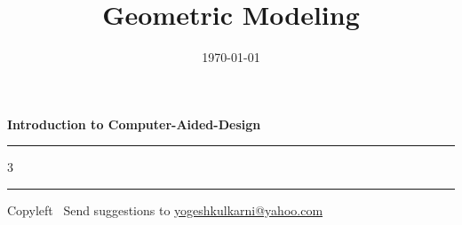 \documentclass[9pt,portrait]{article}
\title[Intro to CAD \hspace{4cm} \insertframenumber /\inserttotalframenumber]{Geometric Modeling}
\subtitle[]{}
\date[2014]{\today}
\begin{document}
\raggedright
\footnotesize
\begin{center}
     \Large{\textbf{Introduction to Computer-Aided-Design}}  
\end{center}
\rule{\linewidth}{0.25pt}

\begin{multicols}{3}




\rule{\linewidth}{0.25pt}
\scriptsize
Copyleft \textcopyleft\  Send suggestions to 
\href{http://www.yogeshkulkarni.com}{yogeshkulkarni@yahoo.com}


\end{multicols}


\end{document}
